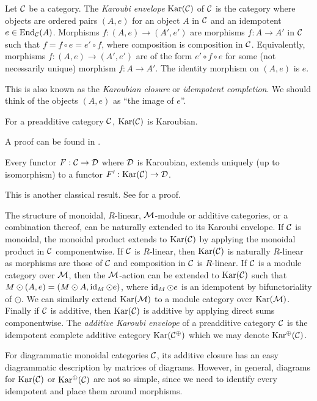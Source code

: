 \begin{definition}
    Let $\mathcal{C}$ be a category. The \textit{Karoubi envelope} $\operatorname{Kar}(\mathcal{C})$ of $\mathcal{C}$ is the category where objects are ordered pairs $(A,e)$ for an object $A$ in $\mathcal{C}$ and an idempotent $e \in \operatorname{End}_{\mathcal{C}}(A)$.  Morphisms $f: (A, e) \to (A', e')$ are morphisms $f:A \to A'$ in $\mathcal{C}$ such that $f = f \circ e = e' \circ f$, where composition is composition in $\mathcal{C}$. Equivalently, morphisms $f: (A, e) \to (A', e')$ are of the form $e'\circ f \circ e$ for some (not necessarily unique) morphism $f: A \to A'$. The identity morphism on $(A,e)$ is $e$.
\end{definition}

This is also known as the \textit{Karoubian closure} or \textit{idempotent completion}. We should think of the objects $(A,e)$ as ``the image of $e$''.

\begin{proposition}
    For a preadditive category $\mathcal{C}$, $\operatorname{Kar}(\mathcal{C})$ is Karoubian.
\end{proposition}

A proof can be found in \cite[Lemma 11.17]{intro-soergel-bimodules}.

\begin{lemma}
    Every functor $F: \mathcal{C} \to \mathcal{D}$ where $\mathcal{D}$ is Karoubian, extends uniquely (up to isomorphism) to a functor $F': \operatorname{Kar}(\mathcal{C}) \to \mathcal{D}$.
\end{lemma}

This is another classical result. See \cite[Proposition 6.5.9 (1)]{borceux-categorical-algebra} for a proof.

The structure of monoidal, $R$-linear, $\mathcal{M}$-module or additive categories, or a combination thereof, can be naturally extended to its Karoubi envelope. If $\mathcal{C}$ is monoidal, the monoidal product extends to $\operatorname{Kar}(\mathcal{C})$ by applying the monoidal product in $\mathcal{C}$ componentwise. If $\mathcal{C}$ is $R$-linear, then $\operatorname{Kar}(\mathcal{C})$ is naturally $R$-linear as morphisms are those of $\mathcal{C}$ and composition in $\mathcal{C}$ is $R$-linear. If $\mathcal{C}$ is a module category over $\mathcal{M}$, then the $\mathcal{M}$-action can be extended to $\operatorname{Kar}(\mathcal{C})$ such that $M \odot (A,e) = (M \odot A, \operatorname{id}_M \odot e)$, where $\operatorname{id}_M \odot e$ is an idempotent by bifunctoriality of $\odot$. We can similarly extend $\operatorname{Kar}(\mathcal{M})$ to a module category over $\operatorname{Kar}(\mathcal{M})$. Finally if $\mathcal{C}$ is additive, then $\operatorname{Kar}(\mathcal{C})$ is additive by applying direct sums componentwise. The \textit{additive Karoubi envelope} of a preadditive category $\mathcal{C}$ is the idempotent complete additive category $\operatorname{Kar}(\mathcal{C}^\oplus)$ which we may denote $\operatorname{Kar^\oplus}(\mathcal{C})$.

For diagrammatic monoidal categories $\mathcal{C}$, its additive closure has an easy diagrammatic description by matrices of diagrams. However, in general, diagrams for $\operatorname{Kar}(\mathcal{C})$ or $\operatorname{Kar^\oplus}(\mathcal{C})$ are not so simple, since we need to identify every idempotent and place them around morphisms.



